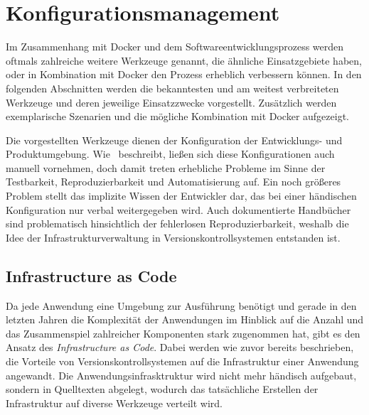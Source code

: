 \chapter{Konfigurationsmanagement}
\label{cha:konfigurationsmanagement}
Im Zusammenhang mit Docker und dem Softwareentwicklungsprozess werden oftmals zahlreiche weitere Werkzeuge genannt, die ähnliche Einsatzgebiete haben, oder in Kombination mit Docker den Prozess erheblich verbessern können.
In den folgenden Abschnitten werden die bekanntesten und am weitest verbreiteten Werkzeuge und deren jeweilige Einsatzzwecke vorgestellt.
Zusätzlich werden exemplarische Szenarien und die mögliche Kombination mit Docker aufgezeigt.

Die vorgestellten Werkzeuge dienen der Konfiguration der Entwicklungs- und Produktumgebung.
Wie~\autocite[29\psq]{Wolff201604} beschreibt, ließen sich diese Konfigurationen auch manuell vornehmen, doch damit treten erhebliche Probleme im Sinne der Testbarkeit, Reproduzierbarkeit und Automatisierung auf.
Ein noch größeres Problem stellt das implizite Wissen der Entwickler dar, das bei einer händischen Konfiguration nur verbal weitergegeben wird.
Auch dokumentierte Handbücher sind problematisch hinsichtlich der fehlerlosen Reproduzierbarkeit, weshalb die Idee der Infrastrukturverwaltung in Versionskontrollsystemen entstanden ist.


\section{Infrastructure as Code}
\label{sec:infrastructureascode}
Da jede Anwendung eine Umgebung zur Ausführung benötigt und gerade in den letzten Jahren die Komplexität der Anwendungen im Hinblick auf die Anzahl und das Zusammenspiel zahlreicher Komponenten stark zugenommen hat, gibt es den Ansatz des \emph{Infrastructure as Code}.
Dabei werden wie zuvor bereits beschrieben, die Vorteile von Versionskontrollsystemen auf die Infrastruktur einer Anwendung angewandt.
Die Anwendungsinfrasktruktur wird nicht mehr händisch aufgebaut, sondern in Quelltexten abgelegt, wodurch das tatsächliche Erstellen der Infrastruktur auf diverse Werkzeuge verteilt wird.

